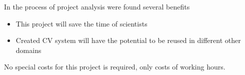 
In the process of project analysis were found several benefits
\begin{itemize}
	\item This project will save the time of scientists
	\item Created CV system will have the potential to be reused in different other domains
\end{itemize}
No special costs for this project is required, only costs of working hours.